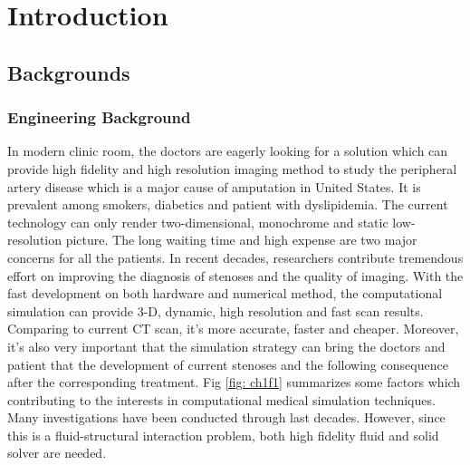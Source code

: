 \chapter{Introduction}
\label{ch:chap1}


\section{Backgrounds}

\subsection{Engineering Background}

In modern clinic room, the doctors are eagerly looking for a solution which can provide high fidelity and high resolution imaging method to study the peripheral artery disease which is a major cause of amputation in United States. It is prevalent among smokers, diabetics and patient with dyslipidemia. The  current technology can only render two-dimensional,  monochrome and static low-resolution picture. The long waiting time and high expense are two major concerns for all the patients. In recent decades, researchers contribute tremendous effort on improving the diagnosis of stenoses and the quality of imaging\cite{clark1976fluid, nesbitt2009shear, wardlaw2006non, stergiopulos1992computer, long2001numerical}. With the fast development on both hardware and numerical method, the computational simulation can provide 3-D, dynamic, high resolution and fast scan results. Comparing to current CT scan, it's more accurate, faster and cheaper. Moreover, it's also very important that the simulation strategy can bring the doctors and patient that the development of current stenoses and the following consequence after the corresponding treatment. Fig \ref{fig: ch1f1} summarizes some factors which contributing to the interests in computational medical simulation techniques\cite{barry2005features}. Many investigations have been conducted through last decades\cite{feng2012viscous, bertram2010evaluation, nadeem2010simulation, ogulu2005simulation}. However, since this is a fluid-structural interaction problem, both high fidelity fluid and solid solver are needed. 

